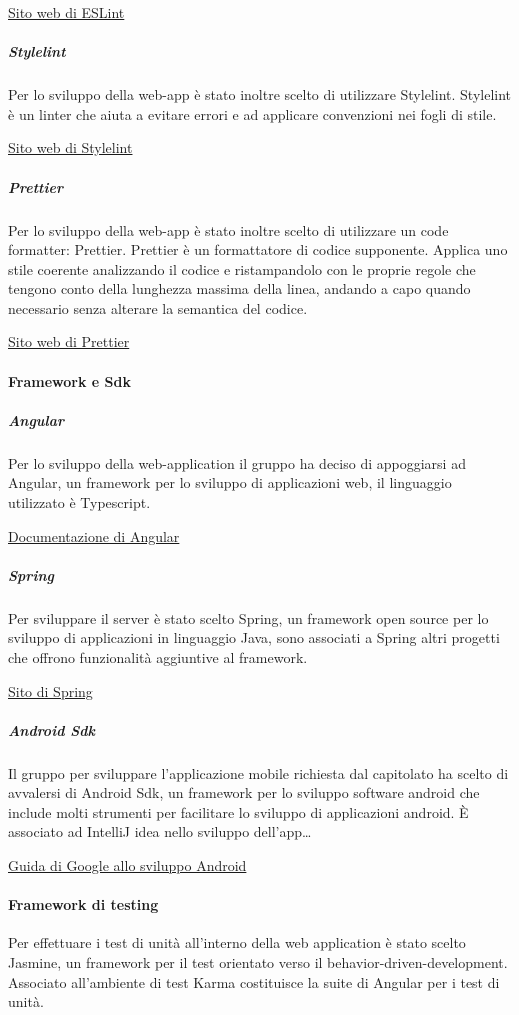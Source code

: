 \documentclass[../../norme-di-progetto.tex]{subfiles}
\begin{document}
\href{https://eslint.org/}{Sito web di ESLint}

\subparagraph{Stylelint}%
\label{subp:stylelint}
Per lo sviluppo della web-app è stato inoltre scelto di utilizzare Stylelint.
Stylelint è un linter che aiuta a evitare errori e ad applicare convenzioni nei fogli di stile.

\href{https://stylelint.io/}{Sito web di Stylelint}

\subparagraph{Prettier}%
\label{subp:stylelint}
Per lo sviluppo della web-app è stato inoltre scelto di utilizzare un code formatter: Prettier.
Prettier è un formattatore di codice supponente. Applica uno stile coerente analizzando il codice e ristampandolo con le proprie regole che tengono conto della lunghezza massima della linea, andando a capo quando necessario senza alterare la semantica del codice.

\href{https://prettier.io/}{Sito web di Prettier}

\paragraph{Framework e Sdk}%
\label{par:framework_sdk}

\subparagraph{Angular}%
\label{subp:angular}
Per lo sviluppo della web-application il gruppo ha deciso di appoggiarsi ad Angular, un framework per lo sviluppo di applicazioni web, il linguaggio utilizzato è Typescript.

\href{https://angular.io/docs}{Documentazione di Angular}

\subparagraph{Spring}%
\label{subp:spring}
Per sviluppare il server è stato scelto Spring, un framework open source per lo sviluppo di applicazioni in linguaggio Java, sono associati a Spring altri progetti che offrono funzionalità aggiuntive al framework.

\href{https://spring.io/}{Sito di Spring}

\subparagraph{Android Sdk}%
\label{subp:android_sdk}
Il gruppo per sviluppare l'applicazione mobile richiesta dal capitolato ha scelto di avvalersi di Android Sdk, un framework per lo sviluppo software android che include molti strumenti per facilitare lo sviluppo di applicazioni android.
È associato ad IntelliJ idea nello sviluppo dell'app\dots

\href{https://developer.android.com/guide}{Guida di Google allo sviluppo Android}

\paragraph{Framework di testing}%
\label{par:framework_test}
Per effettuare i test di unità all'interno della web application è stato scelto Jasmine, un framework per il test orientato verso il behavior-driven-development.
Associato all'ambiente di test Karma costituisce la suite di Angular per i test di unità.
\end{document}
